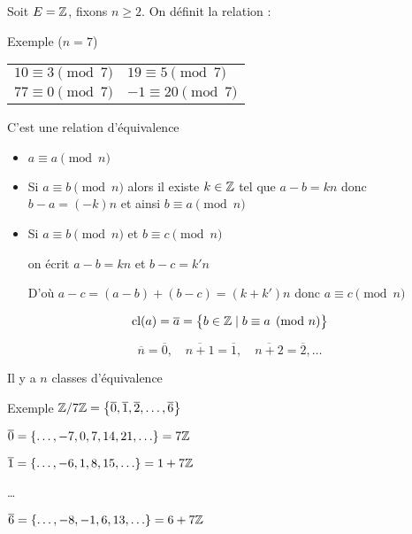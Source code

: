 \begin{frame}
Soit $E = \mathbb{Z}$, fixons $n\ge 2$. On définit la relation :

\pause
\bigskip

Exemple ($n=7$) \quad
\begin{tabular}{ll}
$10 \equiv 3 \pmod 7$ & \pause $19 \equiv 5 \pmod 7$ \\ \pause
$77 \equiv 0 \pmod 7$ & \pause $-1 \equiv 20 \pmod 7$ \\
\end{tabular}

\pause
\bigskip

C'est une relation d'équivalence

\pause

\begin{itemize}
  \item $a\equiv a \pmod n$

\pause

  \item Si $a \equiv b \pmod n$ alors il existe $k\in \mathbb{Z}$ tel que
$a-b=kn$ donc $b-a = (-k)n$ et ainsi $b\equiv a \pmod n$

\pause

  \item Si $a \equiv b \pmod n$ et $b \equiv c \pmod n$ 

on écrit $a-b=kn$ et $b-c=k'n$

D'où $a-c = (a-b) + (b-c) = (k+k')n$ donc $a \equiv c \pmod n$
\end{itemize}
\end{frame}


\begin{frame}
$$\text{cl}(a)=\overline a = \big\{ b \in \mathbb{Z} \mid b \equiv a \pmod n \big\}$$
\pause
\vspace*{-3ex}

\pause

$$\overline n = \overline 0,\quad  \overline {n+1} = \overline 1, \quad \overline {n+2} = \overline 2, \ldots$$

\pause

Il y a $n$ classes d'équivalence

\pause

Exemple $\mathbb{Z}/7\mathbb{Z} = \big\{  \overline 0, \overline 1, \overline 2,\ldots, \overline{6} \big\}$

\pause

\qquad $\overline 0 = \{\ldots,-7,0,7,14,21,\ldots\} = 7\mathbb{Z}$ 

\pause

\qquad $\overline 1 = \{\ldots, -6, 1, 8, 15, \ldots \} = 1+ 7\mathbb{Z}$

\pause

\qquad \ldots 

\qquad $\overline 6 = \{\ldots,-8, -1, 6, 13, \ldots \} = 6+7\mathbb{Z}$

\pause %


\end{frame}

